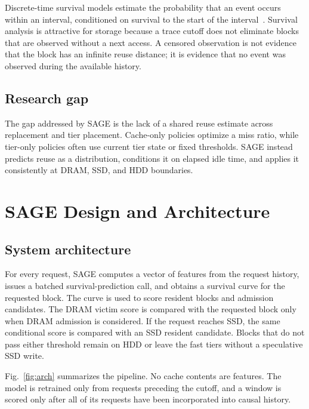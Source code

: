 \documentclass[conference]{IEEEtran}
\begin{document}
Discrete-time survival models estimate the probability that an event occurs within an interval, conditioned on survival to the start of the interval~\cite{singer}. Survival analysis is attractive for storage because a trace cutoff does not eliminate blocks that are observed without a next access. A censored observation is not evidence that the block has an infinite reuse distance; it is evidence that no event was observed during the available history.

\subsection{Research gap}
The gap addressed by SAGE is the lack of a shared reuse estimate across replacement and tier placement. Cache-only policies optimize a miss ratio, while tier-only policies often use current tier state or fixed thresholds. SAGE instead predicts reuse as a distribution, conditions it on elapsed idle time, and applies it consistently at DRAM, SSD, and HDD boundaries.

\section{SAGE Design and Architecture}
\subsection{System architecture}
For every request, SAGE computes a vector of features from the request history, issues a batched survival-prediction call, and obtains a survival curve for the requested block. The curve is used to score resident blocks and admission candidates. The DRAM victim score is compared with the requested block only when DRAM admission is considered. If the request reaches SSD, the same conditional score is compared with an SSD resident candidate. Blocks that do not pass either threshold remain on HDD or leave the fast tiers without a speculative SSD write.

Fig.~\ref{fig:arch} summarizes the pipeline. No cache contents are features. The model is retrained only from requests preceding the cutoff, and a window is scored only after all of its requests have been incorporated into causal history.
\end{document}
